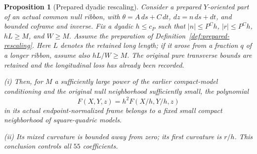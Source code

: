 \documentclass[11pt]{amsart}
\newtheorem{proposition}[theorem]{Proposition}
\theoremstyle{definition}
\theoremstyle{remark}
\numberwithin{equation}{section}
\begin{document}
\begin{proposition}[Prepared dyadic rescaling]\label{low:5:qsa:preparedscaling}
Consider a prepared $Y$-oriented part of an actual common null ribbon, with $\theta=A\,ds+C\,dt$, $dz=n\,ds+dt$, and bounded coframe and inverse. Fix a dyadic $h\le c_P$ such that $|n|\le P^Ch$, $|r|\le P^Ch$, $hL\ge M$, and $W\ge M$. Assume the preparation of Definition~\ref{def:prepared-rescaling}. Here $L$ denotes the retained long length; if it arose from a fraction $q$ of a longer ribbon, assume also $hL/W\ge M$. The original pure transverse bounds are retained and the longitudinal loss has already been recorded.

\noindent\textup{(i)} Then, for $M$ a sufficiently large power of the earlier compact-model conditioning and the original null neighborhood sufficiently small, the polynomial
\[
\widehat F(X,Y,z)=h^2F(X/h,Y/h,z)
\]
in its actual endpoint-normalized frame belongs to a fixed small compact neighborhood of square-quadric models.

\noindent\textup{(ii)} Its mixed curvature is bounded away from zero; its first curvature is $r/h$. This conclusion controls all $55$ coefficients.
\end{proposition}
\end{document}
